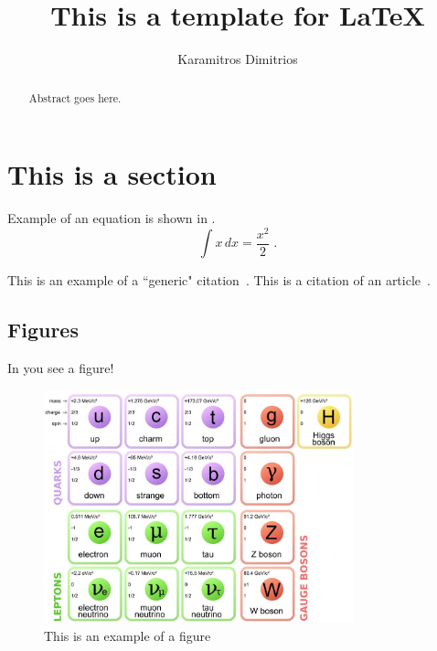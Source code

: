 \documentclass[11pt,a4paper]{article}
\author{Karamitros Dimitrios}
\title{This is a template for \LaTeX}
\begin{document}
\maketitle

\begin{abstract}
    Abstract goes here.
\end{abstract}


\section{This is a section}\label{sec:Intro}
\setcounter{equation}{0}

Example of an  equation is shown in .
%
\begin{equation}
	\int x \, dx =\dfrac{x^2}{2} \;.
\label{eq:example}
\end{equation}


This is an example of a ``generic" citation~\cite{NaBBODES}. This is a citation of an article~\cite{Darme:2019wpd}.

\subsection{Figures}\label{subsec:figs}
%
In  you see a figure!
%
\begin{figure}[h!]
	\centering	\includegraphics[width=0.8\textwidth]{figs/SM.jpg}
	\caption{This is an example of a figure}
	\label{fig:example}
\end{figure}
%
\end{document}

